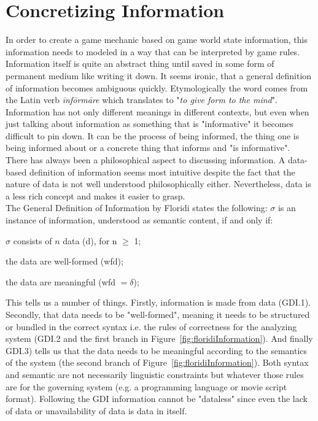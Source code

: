 \section{Concretizing Information}
\label{section:info}
In order to create a game mechanic based on game world state information, this information needs to modeled in a way that can be interpreted by game rules. Information itself is quite an abstract thing until saved in some form of permanent medium like writing it down. It seems ironic, that a general definition of information becomes ambiguous quickly. Etymologically the word comes from the Latin verb \textit{\={i}nf\={o}rm\={a}re} which translates to "\textit{to give form to the mind}". Information has not only different meanings in different contexts, but even when just talking about information as something that is "informative" it becomes difficult to pin down. It can be the process of being informed, the thing one is being informed about or a concrete thing that informs and "is informative".~\cite{Buckland1991}\\
There has always been a philosophical aspect to discussing information. A data-based definition of information seems most intuitive despite the fact that the nature of data is not well understood philosophically either. Nevertheless, data is a less rich concept and makes it easier to grasp.\\
The General Definition of Information by Floridi states the following:
\vspace*{0.5cm}
 $\sigma$ is an instance of information, understood as semantic content, if and only if:\par
{} $\sigma$ consists of $n$ data (d), for n $\geq$ 1;\par
{} the data are well-formed (wfd);\par
{} the data are meaningful (wfd $= \delta$);\par
\vspace*{0.5cm}
This tells us a number of things. Firstly, information is made from data (GDI.1). Secondly, that data needs to be "well-formed", meaning it needs to be structured or bundled in the correct syntax i.e. the rules of correctness for the analyzing system (GDI.2 and the first branch in Figure~\ref{fig:floridiInformation}). And finally GDI.3) tells us that the data needs to be meaningful according to the semantics of the system (the second branch of Figure~\ref{fig:floridiInformation}). Both syntax and semantic are not necessarily linguistic constraints but whatever those rules are for the governing system (e.g. a programming language or movie script format). Following the GDI information cannot be "dataless" since even the lack of data or unavailability of data is data in itself.~\cite{Floridi2010}\\
